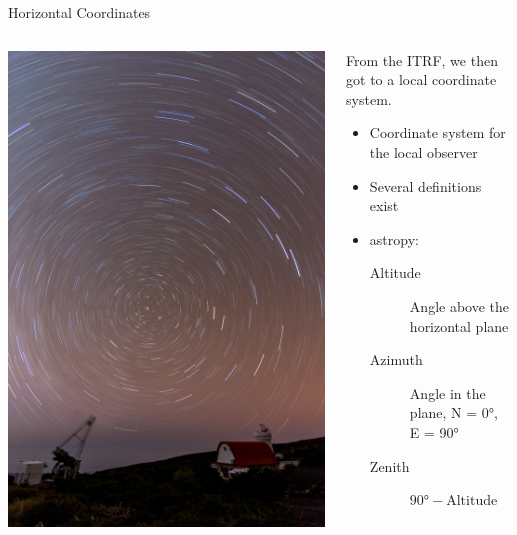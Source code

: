 \documentclass[aspectratio=1610, 9pt]{beamer}
\begin{document}
\begin{frame}{Horizontal Coordinates}


  \begin{columns}[c, onlytextwidth]
    \begin{column}{0.35\textwidth}
      \includegraphics[width=\textwidth]{images/trails.jpg}
    \end{column}
    \hfill
    \begin{column}{0.6\textwidth}
      From the ITRF, we then got to a local coordinate system.

      \begin{itemize}
        \item Coordinate system for the local observer
        \item Several definitions exist
        \item astropy:
          \begin{description}
            \item[Altitude] Angle above the horizontal plane
            \item[Azimuth] Angle in the plane, N = \ang{0}, E = \ang{90}
            \item[Zenith] $\ang{90} - \text{Altitude}$
          \end{description}
      \end{itemize}
    \end{column}
  \end{columns}
\end{frame}
\end{document}
